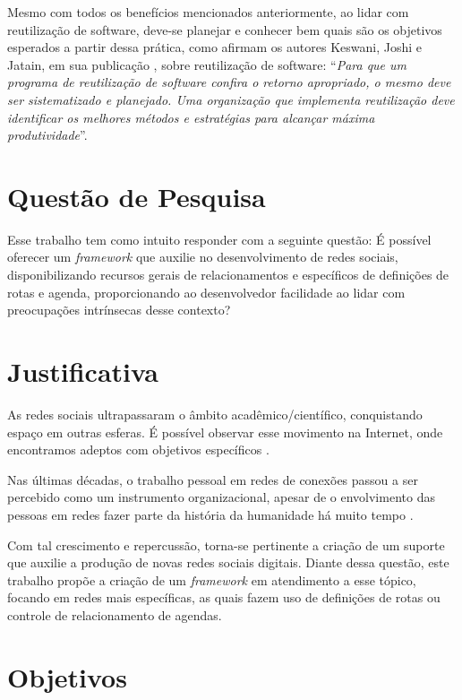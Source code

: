 Mesmo com todos os benefícios mencionados anteriormente, ao lidar com reutilização de software, deve-se planejar e conhecer bem quais são os objetivos esperados a partir dessa prática, como afirmam os autores Keswani, Joshi e Jatain, em sua publicação  \cite{Keswani:Joshi:Jatain:2014}, sobre reutilização de software: ``\textit{Para que um programa de reutilização de software confira o retorno apropriado, o mesmo deve ser sistematizado e planejado. Uma organização que implementa reutilização deve identificar os melhores métodos e estratégias para alcançar máxima produtividade}''.

\section*{Questão de Pesquisa}

Esse trabalho tem como intuito responder com a seguinte questão: É possível oferecer um \textit{framework} que auxilie no desenvolvimento de redes sociais, disponibilizando recursos gerais de relacionamentos e específicos de definições de rotas e agenda, proporcionando ao desenvolvedor facilidade ao lidar com preocupações intrínsecas desse contexto?

\section*{Justificativa}

As redes sociais ultrapassaram o âmbito acadêmico/científico, conquistando espaço em outras esferas. É possível observar esse movimento na Internet, onde encontramos adeptos com objetivos específicos \cite{Tomae:Alcara:Chiara:2005}.

Nas últimas décadas, o trabalho pessoal em redes de conexões passou a ser percebido como um instrumento organizacional, apesar de o envolvimento das pessoas em redes fazer parte da história da humanidade há muito tempo \cite{Tomae:Alcara:Chiara:2005}.

Com tal crescimento e repercussão, torna-se pertinente a criação de um suporte que auxilie a produção de novas redes sociais digitais. Diante dessa questão, este trabalho propõe a criação de um \textit{framework} em atendimento a esse tópico, focando em redes mais específicas, as quais fazem uso de definições de rotas ou controle de relacionamento de agendas.

\section*{Objetivos}

